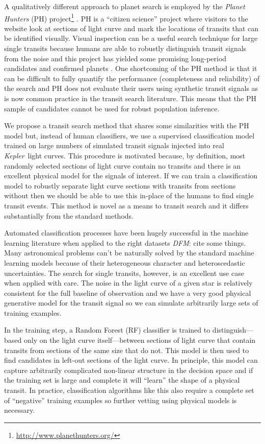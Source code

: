 \documentclass[12pt,preprint]{aastex}
\newcommand{\project}[1]{\textsl{#1}}
\newcommand{\kepler}{\project{Kepler}}
\newcommand{\todo}[3]{{\color{#2}\emph{#1}: #3}}
\newcommand{\dfmtodo}[1]{\todo{DFM}{red}{#1}}
\begin{document}
A qualitatively different approach to planet search is employed by the
\project{Planet Hunters} (PH)
project\footnote{\url{http://www.planethunters.org/}} \citep{Fischer:2012}.
PH is a ``citizen science'' project where visitors to the website look at
sections of light curve and mark the locations of transits that can be
identified visually.
Visual inspection can be a useful search technique for large single transits
because humans are able to robustly distinguish transit signals from the noise
and this project has yielded some promising long-period candidates and
confirmed planets \citep[for example][]{Wang:2013}.
One shortcoming of the PH method is that it can be difficult to fully quantify
the performance (completeness and reliability) of the search and PH does not
evaluate their users using synthetic transit signals as is now common practice
in the transit search literature.
This means that the PH sample of candidates cannot be used for robust
population inference.

We propose a transit search method that shares some similarities with the PH
model but, instead of human classifiers, we use a supervised classification
model trained on large numbers of simulated transit signals injected into
real \kepler\ light curves.
This procedure is motivated because, by definition, most randomly selected
sections of light curve contain no transits and there is an excellent physical
model for the signals of interest.
If we can train a classification model to robustly separate light curve
sections with transits from sections without then we should be able to use
this in-place of the humans to find single transit events.
This method is novel as a means to transit search and it differs substantially
from the standard methods.

Automated classification processes have been hugely successful in the machine
learning literature when applied to the right datasets \dfmtodo{cite some
things}.
Many astronomical problems can't be naturally solved by the standard machine
learning models because of their heterogeneous character and heteroscedastic
uncertainties.
The search for single transits, however, is an excellent use case when applied
with care.
The noise in the light curve of a given star is relatively consistent for the
full baseline of observation and we have a very good physical generative model
for the transit signal so we can simulate arbitrarily large sets of training
examples.

In the training step, a Random Forest (RF) classifier is trained to
distinguish---based only on the light curve itself---between sections of light
curve that contain transits from sections of the same size that do not.
This model is then used to find candidates in left-out sections of the light
curve.
In principle, this model can capture arbitrarily complicated non-linear
structure in the decision space and if the training set is large and complete
it will ``learn'' the shape of a physical transit.
In practice, classification algorithms like this also require a complete set
of ``negative'' training examples so further vetting using physical models
is necessary.
\end{document}
